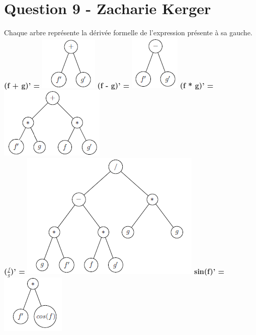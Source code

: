 \documentclass[10pt,a4paper]{article}
\begin{document}
\section*{Question 9 - Zacharie Kerger}

Chaque arbre représente la dérivée formelle de l'expression présente à sa gauche.\\

\textbf{(f + g)' =} \includegraphics[scale=1]{q9-f+g.png}
\textbf{(f - g)' =} \includegraphics[scale=1]{q9-f-g.png}
\textbf{(f * g)' =} \includegraphics[scale=1]{q9-fg.png} \\
\textbf{($\frac{f}{g}$)' =} \includegraphics[scale=1]{q9-fdivg.png}
\textbf{sin(f)' =} \includegraphics[scale=1]{q9-sinf.png} \\
\end{document}
